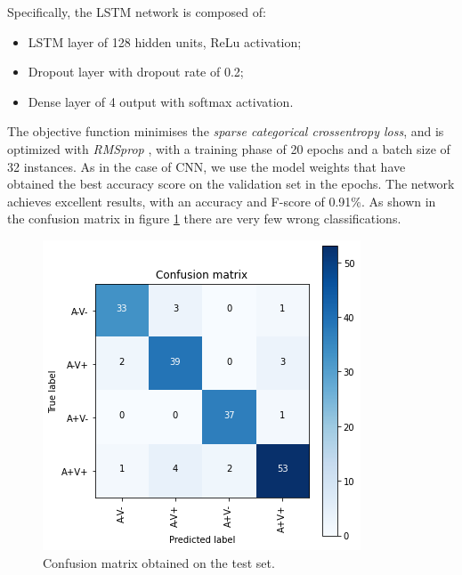 \documentclass[runningheads]{llncs}
\begin{document}
Specifically, the LSTM network is composed of:
\begin{itemize}
    \item LSTM layer of 128 hidden units, ReLu activation;
    \item Dropout layer with dropout rate of 0.2;
    \item Dense layer of 4 output with softmax activation.
\end{itemize}
The objective function minimises the \textit{sparse categorical crossentropy loss}, and is optimized with \textit{RMSprop} \cite{tieleman2012rmsprop}, with a training phase of 20 epochs and a batch size of 32 instances. As in the case of CNN, we use the model weights that have obtained the best accuracy score on the validation set in the epochs. The network achieves excellent results, with an accuracy and F-score of 0.91\%. As shown in the confusion matrix in figure \ref{Conf-train-lstm} there are very few wrong classifications.

\begin{figure}
\centering
\includegraphics[scale = 0.48]{img/confusion-matrix-lstm.png}
\caption{Confusion matrix obtained on the test set.}
\label{Conf-train-lstm}
\end{figure}
\end{document}
